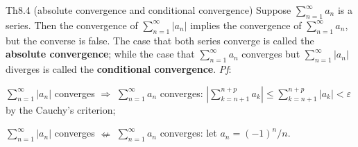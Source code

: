 \documentclass{article}
\begin{document}
\begin{Th}{Th8.4 (absolute convergence and conditional convergence)}
    Suppose $\sum_{n=1}^{\infty} a_n$ is a series. Then the convergence of $\sum_{n=1}^{\infty} |a_n|$ implies the convergence of $\sum_{n=1}^{\infty} a_n$, but the converse is false. \textcolor{Df}{The case that both series converge is called the \textbf{absolute convergence}; while the case that $\sum_{n=1}^{\infty} a_n$ converges but $\sum_{n=1}^{\infty} |a_n|$ diverges is called the \textbf{conditional convergence}}.
    \tcblower
    \textit{Pf}: 
    \begin{compactenum}
        \item $\sum_{n=1}^{\infty} |a_n|$ converges $\Rightarrow$ $\sum_{n=1}^{\infty} a_n $ converges: $|\sum_{k=n+1}^{n+p} a_k| \leq \sum_{k=n+1}^{n+p} |a_k| < \varepsilon$ by the Cauchy's criterion;
        \item $\sum_{n=1}^{\infty} |a_n|$ converges $\nLeftarrow$ $\sum_{n=1}^{\infty} a_n $ converges: let $a_n = (-1)^n/n$.
    \end{compactenum}
\end{Th}
\end{document}
